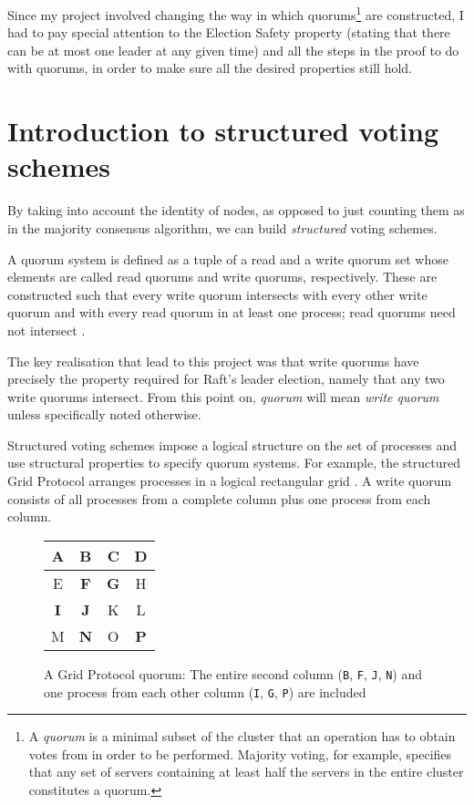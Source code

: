 \documentclass[11pt,chapterprefix=true,toc=bibliography,numbers=noendperiod,
               footnotes=multiple,twoside]{scrreprt}
\newcommand{\voted}[1]{\textbf{\color{black}#1}}
\begin{document}
Since my project involved changing the way in which quorums\footnote{A \emph{quorum} is a minimal subset of the cluster that an operation has to obtain votes from in order to be performed. Majority voting, for example, specifies that any set of servers containing at least half the servers in the entire cluster constitutes a quorum.} are constructed, I had to pay special attention to the Election Safety property (stating that there can be at most one leader at any given time) and all the steps in the proof to do with quorums, in order to make sure all the desired properties still hold.

\section{Introduction to structured voting schemes\label{ssc:structured-voting-schemes}}

By taking into account the identity of nodes, as opposed to just counting them as in the majority consensus algorithm, we can build \emph{structured} voting schemes.


A quorum system is defined as a tuple of a read and a write quorum set whose elements are called read quorums and write quorums, respectively. These are constructed such that every write quorum intersects with every other write quorum and with every read quorum in at least one process; read quorums need not intersect \autocite{voting}.

The key realisation that lead to this project was that write quorums have precisely the property required for Raft's leader election, namely that any two write quorums intersect. From this point on, \emph{quorum} will mean \emph{write quorum} unless specifically noted otherwise.


Structured voting schemes impose a logical structure on the set of processes and use structural properties to specify quorum systems. For example, the structured Grid Protocol arranges processes in a logical rectangular grid \autocite{grid}. A write quorum consists of all processes from a complete column plus one process from each column.

\begin{figure}[h]
    \centering
    {\ttfamily\color{gray}
    \begin{tabular}{c | c | c | c}
        A & \voted{B} & C & D \\
        \hline
        E & \voted{F} & \voted{G} & H \\
        \hline
        \voted{I} & \voted{J} & K & L \\
        \hline
        M & \voted{N} & O & \voted{P} \\
    \end{tabular}
    }
    \caption[Grid protocol quorum table]{A Grid Protocol quorum: The entire second column (\texttt{B}, \texttt{F}, \texttt{J}, \texttt{N}) and one process from each other column (\texttt{I}, \texttt{G}, \texttt{P}) are included}
    \label{fig:grid-quorum}
\end{figure}
\end{document}
